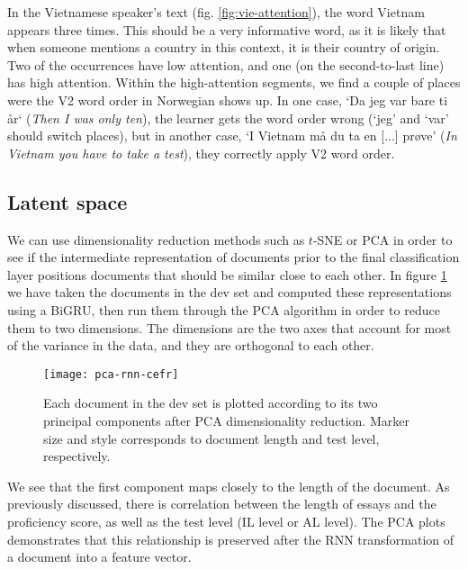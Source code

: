 In the Vietnamese speaker's text (fig. \ref{fig:vie-attention}), the word
Vietnam appears three times. This should be a very informative word, as it is
likely that when someone mentions a country in this context, it is their
country of origin. Two of the occurrences have low attention, and one (on the
second-to-last line) has high attention. Within the high-attention segments, we
find a couple of places were the V2 word order in Norwegian shows up. In one
case, `Da jeg var bare ti år` (\emph{Then I was only ten}), the learner gets
the word order wrong (`jeg' and `var' should switch places), but in another
case, `I Vietnam må du ta en [...] prøve' (\emph{In Vietnam you have to take
a test}), they correctly apply V2 word order.


\subsection{Latent space}

We can use dimensionality reduction methods such as $t$-SNE or \ac{PCA} in
order to see if the intermediate representation of documents prior to the
final classification layer positions documents that should be similar close
to each other. In figure \ref{fig:pca-rnn-cefr} we have taken the documents
in the dev set and computed these representations using a BiGRU, then run
them through the PCA algorithm in order to reduce them to two dimensions. The
dimensions are the two axes that account for most of the variance in the
data, and they are orthogonal to each other.

\begin{figure}
  \centering
  \texttt{[image: pca-rnn-cefr]}
  \caption[PCA plot of the vector representations of documents]{
    Each document in the dev set is plotted according to its two principal
    components after PCA dimensionality reduction. Marker size and style
    corresponds to document length and test level, respectively.
  }
  \label{fig:pca-rnn-cefr}
\end{figure}

We see that the first component maps closely to the length of the document.
As previously discussed, there is correlation between the length of essays
and the proficiency score, as well as the test level (IL level or AL level).
The PCA plots demonstrates that this relationship is preserved after the RNN
transformation of a document into a feature vector.
